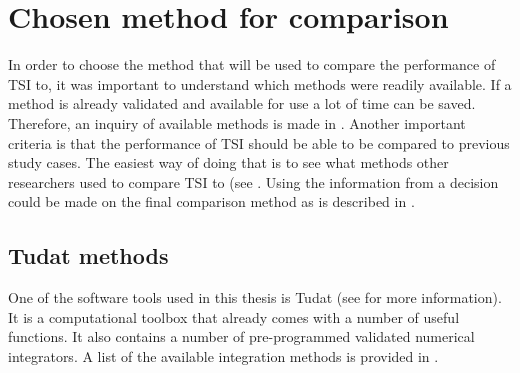\section{Chosen method for comparison}
\label{sec:chosenMethodForComparison}
In order to choose the method that will be used to compare the performance of \ac{TSI} to, it was important to understand which methods were readily available. If a method is already validated and available for use a lot of time can be saved. Therefore, an inquiry of available methods is made in . Another important criteria is that the performance of \ac{TSI} should be able to be compared to previous study cases. The easiest way of doing that is to see what methods other researchers used to compare \ac{TSI} to (see . Using the information from  a decision could be made on the final comparison method as is described in .

\subsection{Tudat methods}
\label{subsec:tudatMethods}
One of the software tools used in this thesis is \ac{Tudat} (see  for more information). It is a computational toolbox that already comes with a number of useful functions. It also contains a number of pre-programmed validated numerical integrators. A list of the available integration methods is provided in .


